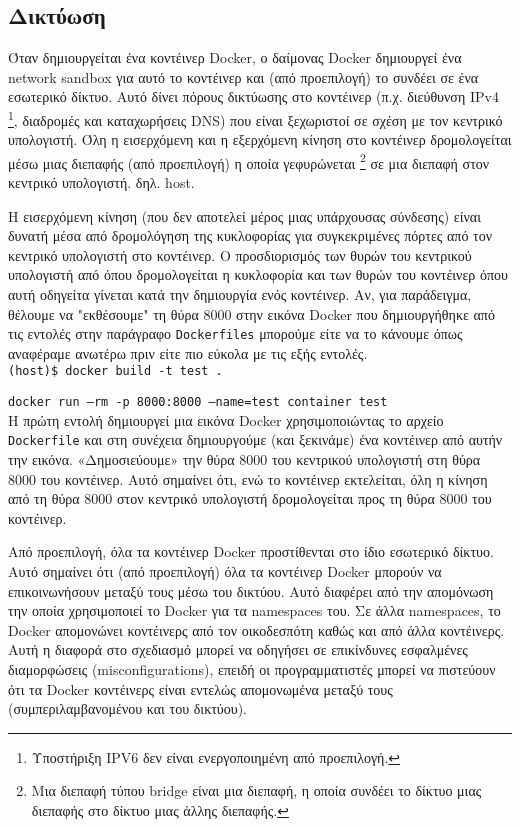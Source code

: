 \subsection{Δικτύωση}

Όταν δημιουργείται ένα κοντέινερ \textlatin{Docker}, ο δαίμονας
\textlatin{Docker} δημιουργεί ένα \textlatin{network sandbox} για αυτό το
κοντέινερ και (από προεπιλογή) το συνδέει σε ένα εσωτερικό δίκτυο. Αυτό δίνει
πόρους δικτύωσης στο κοντέινερ (π.χ. διεύθυνση \textlatin{IPv4}
\footnote{Υποστήριξη \textlatin{IPV6} δεν είναι ενεργοποιημένη από προεπιλογή.},
διαδρομές και καταχωρήσεις \textlatin{DNS}) που είναι ξεχωριστοί σε σχέση με τον
κεντρικό υπολογιστή. Όλη η εισερχόμενη και η εξερχόμενη κίνηση στο κοντέινερ
δρομολογείται μέσω μιας διεπαφής (από προεπιλογή) η οποία γεφυρώνεται 
\footnote{Μια διεπαφή τύπου \textlatin{bridge} είναι μια διεπαφή, η οποία
συνδέει το δίκτυο μιας διεπαφής στο δίκτυο μιας άλλης διεπαφής.} 
σε μια διεπαφή στον κεντρικό υπολογιστή. δηλ. \textlatin{host}.

Η εισερχόμενη κίνηση (που δεν αποτελεί μέρος μιας υπάρχουσας σύνδεσης) είναι
δυνατή μέσα από δρομολόγηση της κυκλοφορίας για συγκεκριμένες πόρτες από τον
κεντρικό υπολογιστή στο κοντέινερ. Ο προσδιορισμός των θυρών του κεντρικού
υπολογιστή από όπου δρομολογείται η κυκλοφορία και των θυρών του κοντέινερ όπου
αυτή οδηγείτα γίνεται κατά την δημιουργία ενός κοντέινερ. Αν, για παράδειγμα,
θέλουμε να "εκθέσουμε" τη θύρα 8000 στην εικόνα \textlatin{Docker} που
δημιουργήθηκε από τις εντολές στην παράγραφο \texttt{\textlatin{Dockerfiles}}
μπορούμε είτε να το κάνουμε όπως αναφέραμε ανωτέρω πριν είτε πιο εύκολα με τις
εξής εντολές. \\

\texttt{\textlatin{(host)\$ docker build -t test .}}

\texttt{\textlatin{docker run --rm -p 8000:8000 --name=test container test}} \\


Η πρώτη εντολή δημιουργεί μια εικόνα \textlatin{Docker} χρησιμοποιώντας το
αρχείο \texttt{\textlatin{Dockerfile}} και στη συνέχεια δημιουργούμε (και
ξεκινάμε) ένα κοντέινερ από αυτήν την εικόνα. «Δημοσιεύουμε» την θύρα 8000 του
κεντρικού υπολογιστή στη θύρα 8000 του κοντέινερ. Αυτό σημαίνει ότι, ενώ το
κοντέινερ εκτελείται, όλη η κίνηση από τη θύρα 8000 στον κεντρικό υπολογιστή
δρομολογείται προς τη θύρα 8000 του κοντέινερ.

Από προεπιλογή, όλα τα κοντέινερ \textlatin{Docker} προστίθενται στο ίδιο
εσωτερικό δίκτυο. Αυτό σημαίνει ότι (από προεπιλογή) όλα τα κοντέινερ
\textlatin{Docker} μπορούν να επικοινωνήσουν μεταξύ τους μέσω του δικτύου.
Αυτό διαφέρει από την απομόνωση την οποία χρησιμοποιεί το \textlatin{Docker}
για τα \textlatin{namespaces} του. Σε άλλα \textlatin{namespaces}, το
\textlatin{Docker} απομονώνει κοντέινερς από τον οικοδεσπότη καθώς και από άλλα
κοντέινερς. Αυτή η διαφορά στο σχεδιασμό μπορεί να οδηγήσει σε επικίνδυνες
εσφαλμένες διαμορφώσεις (\textlatin{misconfigurations}), επειδή οι
προγραμματιστές μπορεί να πιστεύουν ότι τα \textlatin{Docker} κοντέινερς
είναι εντελώς απομονωμένα μεταξύ τους (συμπεριλαμβανομένου και του δικτύου).

